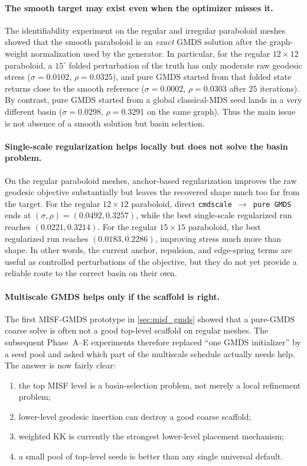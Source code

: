 \documentclass[twoside,11pt]{article}
\begin{document}
\paragraph{The smooth target may exist even when the optimizer misses it.}
The identifiability experiment on the regular and irregular paraboloid meshes
showed that the smooth paraboloid is an \emph{exact} GMDS solution after the
graph-weight normalization used by the generator.  In particular, for the
regular $12\times 12$ paraboloid, a $15^\circ$ folded perturbation of the
truth has only moderate raw geodesic stress
($\sigma = 0.0102$, $\rho = 0.0325$), and pure GMDS started from that folded
state returns close to the smooth reference
($\sigma = 0.0002$, $\rho = 0.0303$ after $25$ iterations).  By contrast,
pure GMDS started from a global classical-MDS seed lands in a very different
basin ($\sigma = 0.0298$, $\rho = 0.3291$ on the same graph).  Thus the main
issue is not absence of a smooth solution but basin selection.

\paragraph{Single-scale regularization helps locally but does not solve the
basin problem.}
On the regular paraboloid meshes, anchor-based regularization improves the raw
geodesic objective substantially but leaves the recovered shape much too far
from the target.  For the regular $12\times 12$ paraboloid, direct
\texttt{cmdscale $\rightarrow$ pure GMDS} ends at
$(\sigma,\rho)=(0.0492, 0.3257)$, while the best single-scale regularized run
reaches $(0.0221, 0.3214)$.  For the regular $15\times 15$ paraboloid, the
best regularized run reaches $(0.0183, 0.2286)$, improving stress much more
than shape.  In other words, the current anchor, repulsion, and edge-spring
terms are useful as controlled perturbations of the objective, but they do not
yet provide a reliable route to the correct basin on their own.

\paragraph{Multiscale GMDS helps only if the scaffold is right.}
The first MISF-GMDS prototype in \cref{sec:misf_gmds} showed that a pure-GMDS
coarse solve is often not a good top-level scaffold on regular meshes.  The
subsequent Phase~A--E experiments therefore replaced ``one GMDS initializer''
by a seed pool and asked which part of the multiscale schedule actually needs
help.  The answer is now fairly clear:
\begin{enumerate}
  \item the top MISF level is a basin-selection problem, not merely a local
  refinement problem;
  \item lower-level geodesic insertion can destroy a good coarse scaffold;
  \item weighted KK is currently the strongest lower-level placement mechanism;
  \item a small pool of top-level seeds is better than any single universal
  default.
\end{enumerate}
\end{document}

